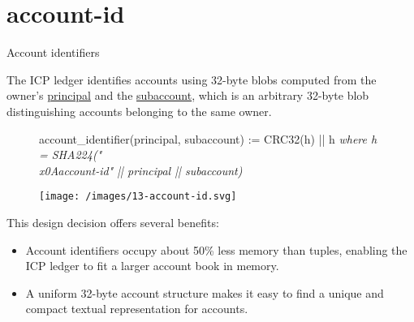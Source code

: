 \documentclass{article}
\begin{document}
\section{account-id}{Account identifiers}

The ICP ledger identifies accounts using 32-byte blobs computed from the owner's \href{https://internetcomputer.org/docs/current/references/ic-interface-spec/#principal}{principal} and the \href{/posts/09-fungible-tokens-101.html#subaccounts}{subaccount}, which is an arbitrary 32-byte blob distinguishing accounts belonging to the same owner.
\begin{figure}
\begin{code}[pseudocode]
account_identifier(principal, subaccount) := CRC32(h) || h
    \em{where} h = SHA224("\\x0Aaccount-id" || principal || subaccount)
\end{code}
\end{figure}

\begin{figure}[grayscale-diagram]
\texttt{[image: /images/13-account-id.svg]}
\end{figure}

This design decision offers several benefits:
\begin{itemize}
  \item
    Account identifiers occupy about 50\% less memory than  tuples, enabling the ICP ledger to fit a larger account book in memory.
  \item
    A uniform 32-byte account structure makes it easy to find a unique and compact textual representation for accounts.
\end{itemize}
\end{document}
